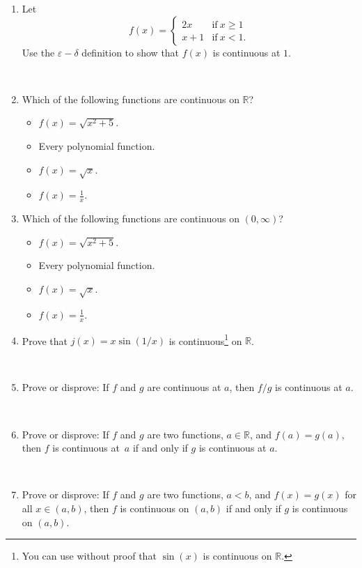 \documentclass[12pt]{amsart}
\newcommand{\R}{\mathbb{R}}
\newcommand{\e}{\varepsilon}
\newcommand{\ds}{\displaystyle}
\begin{document}
\begin{enumerate}
\item Let \[f(x) = \begin{cases} 2x &\text{if} \ x\geq 1 \\ x+1 &\text{if} \ x<1. \end{cases}\]
 Use the $\e-\delta$ definition to show that $f(x)$ is continuous at $1$.
 
\

 \item Which of the following functions are continuous on $\R$?
\begin{multicols}{2} 
\begin{itemize}
 \item $f(x)=\sqrt{ x^2 +5}$.
 \item Every polynomial function.
  \item $f(x) = \sqrt{x}$.
  \item $f(x)=\ds\frac{1}{x}$.
 \end{itemize}
 \end{multicols}
 

 

 
 \item Which of the following functions are continuous on $(0,\infty)$?
 \begin{multicols}{2} 
 \begin{itemize}
 \item $f(x)=\sqrt{ x^2 +5}$.
 \item Every polynomial function.
  \item $f(x) = \sqrt{x}$.
  \item $f(x)=\ds\frac{1}{x}$.
 \end{itemize}
 \end{multicols}
 
 
 
 \item Prove that $j(x) = x \sin(1/x)$ is continuous\footnote{You can use without proof that $\sin(x)$ is continuous on $\R$.} on $\R$.
 
 \
 
 \item Prove or disprove: If $f$ and $g$ are continuous at $a$, then $f/g$ is continuous at $a$.
 
 \
 
 \item Prove or disprove: If $f$ and $g$ are two functions, $a\in \R$, and  $f(a)=g(a)$, then $f$ is continuous at~$a$ if and only if $g$ is continuous at $a$.
 
 \

 
 \item Prove or disprove: If $f$ and $g$ are two functions, $a<b$, and  $f(x)=g(x)$ for all $x\in (a,b)$, then $f$ is continuous on $(a,b)$ if and only if $g$ is continuous on $(a,b)$.
   \end{enumerate}
   
   
\end{document}
